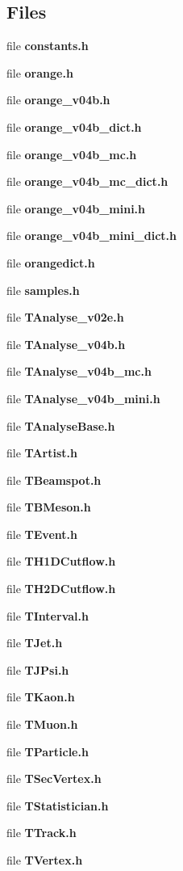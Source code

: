 \subsection*{Files}
\begin{CompactItemize}
\item 
file \textbf{constants.h}
\item 
file \textbf{orange.h}
\item 
file \textbf{orange\_\-v04b.h}
\item 
file \textbf{orange\_\-v04b\_\-dict.h}
\item 
file \textbf{orange\_\-v04b\_\-mc.h}
\item 
file \textbf{orange\_\-v04b\_\-mc\_\-dict.h}
\item 
file \textbf{orange\_\-v04b\_\-mini.h}
\item 
file \textbf{orange\_\-v04b\_\-mini\_\-dict.h}
\item 
file \textbf{orangedict.h}
\item 
file \textbf{samples.h}
\item 
file \textbf{TAnalyse\_\-v02e.h}
\item 
file \textbf{TAnalyse\_\-v04b.h}
\item 
file \textbf{TAnalyse\_\-v04b\_\-mc.h}
\item 
file \textbf{TAnalyse\_\-v04b\_\-mini.h}
\item 
file \textbf{TAnalyse\-Base.h}
\item 
file \textbf{TArtist.h}
\item 
file \textbf{TBeamspot.h}
\item 
file \textbf{TBMeson.h}
\item 
file \textbf{TEvent.h}
\item 
file \textbf{TH1DCutflow.h}
\item 
file \textbf{TH2DCutflow.h}
\item 
file \textbf{TInterval.h}
\item 
file \textbf{TJet.h}
\item 
file \textbf{TJPsi.h}
\item 
file \textbf{TKaon.h}
\item 
file \textbf{TMuon.h}
\item 
file \textbf{TParticle.h}
\item 
file \textbf{TSec\-Vertex.h}
\item 
file \textbf{TStatistician.h}
\item 
file \textbf{TTrack.h}
\item 
file \textbf{TVertex.h}
\end{CompactItemize}
